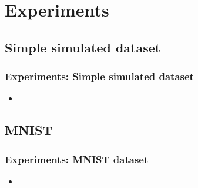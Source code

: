 


\beamertemplatenavigationsymbolsempty{}


\section{Experiments}   
\subsection{Simple simulated dataset}
\begin{frame}
\frametitle{Experiments: Simple simulated dataset}
\begin{itemize}
	\item[] 
\end{itemize}
\end{frame}
\subsection{MNIST}
\begin{frame}
\frametitle{Experiments: MNIST dataset}
\begin{itemize}
	\item[] 
\end{itemize}
\end{frame}




